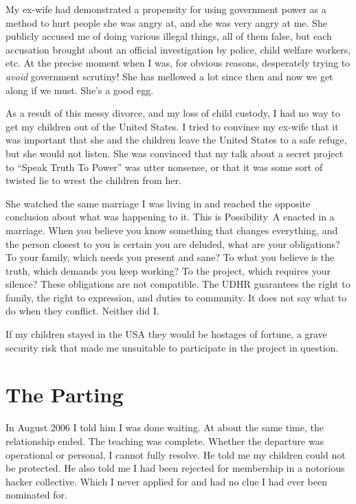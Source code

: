 My ex-wife had demonstrated a propensity for using government power as a method to hurt people she was angry at, and she was very angry at me. She publicly accused me of doing various illegal things, all of them false, but each accusation brought about an official investigation by police, child welfare workers, etc\@. At the precise moment when I was, for obvious reasons, desperately trying to \textit{avoid} government scrutiny! She has mellowed a lot since then and now we get along if we must. She's a good egg.

As a result of this messy divorce, and my loss of child custody, I had no way to get my children out of the United States. I tried to convince my ex-wife that it was important that she and the children leave the United States to a safe refuge, but she would not listen. She was convinced that my talk about a secret project to ``Speak Truth To Power'' was utter nonsense, or that it was some sort of twisted lie to wrest the children from her.

She watched the same marriage I was living in and reached the opposite conclusion about what was happening to it. This is Possibility~A enacted in a marriage. When you believe you know something that changes everything, and the person closest to you is certain you are deluded, what are your obligations? To your family, which needs you present and sane? To what you believe is the truth, which demands you keep working? To the project, which requires your silence? These obligations are not compatible. The UDHR guarantees the right to family, the right to expression, and duties to community. It does not say what to do when they conflict. Neither did I.

If my children stayed in the USA they would be hostages of fortune, a grave security risk that made me unsuitable to participate in the project in question.

\section*{The Parting}
\label{pos23:the-parting}

In August 2006 I told him I was done waiting. At about the same time, the relationship ended. The teaching was complete. Whether the departure was operational or personal, I cannot fully resolve. He told me my children could not be protected. He also told me I had been rejected for membership in a notorious hacker collective. Which I never applied for and had no clue I had ever been nominated for.

